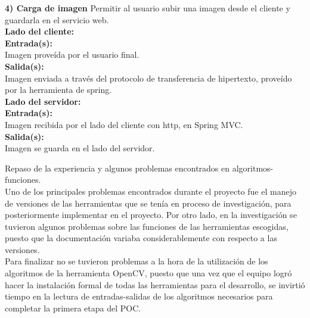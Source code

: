 \documentclass{report}
\begin{document}
\begin{flushleft}
\textbf{4) Carga de imagen}%
Permitir al usuario subir una imagen desde el cliente y guardarla en el servicio web. \\[0.3 cm]


\textbf{Lado del cliente:} \\[0.1 cm]
\textbf{Entrada(s):} \\
	Imagen prove\'ida por el usuario final.  \\
\textbf{Salida(s):} \\
	Imagen enviada a trav\'es del protocolo de transferencia de hipertexto, prove\'ido por la herramienta de spring. \\[0.3 cm]
 
\textbf{Lado del servidor:} \\[0.1 cm]
\textbf{Entrada(s): }\\
	Imagen recibida por el lado del cliente con http, en Spring MVC. \\
 
\textbf{Salida(s): }\\
	Imagen se guarda en el lado del servidor. \\[0.5 cm]
\end{flushleft} 

\large 
\huge Repaso de la experiencia y algunos problemas encontrados en algoritmos-funciones. \\ [ 0.2 cm]

\large Uno de los principales problemas encontrados durante el proyecto fue el manejo de versiones de las herramientas que se ten\'ia en proceso de investigaci\'on, para posteriormente  implementar en el proyecto. Por otro lado, en la investigaci\'on se tuvieron algunos problemas sobre las funciones de las herramientas escogidas, puesto que la documentaci\'on variaba considerablemente con respecto a las versiones.\\ [0.3 cm]
Para finalizar no se tuvieron problemas a la hora de la utilizaci\'on de los algoritmos de la herramienta OpenCV, puesto que una vez que el equipo logr\'o hacer la instalaci\'on formal de todas las herramientas para el desarrollo, se invirti\'o tiempo en la lectura de entradas-salidas de los algoritmos necesarios para completar la primera etapa del POC.
\end{document}
